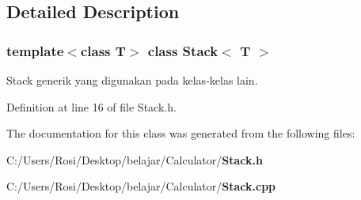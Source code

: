 \subsection{Detailed Description}
\subsubsection*{template$<$class T$>$ class Stack$<$ T $>$}

Stack generik yang digunakan pada kelas-kelas lain. 



Definition at line 16 of file Stack.h.

The documentation for this class was generated from the following files:\begin{CompactItemize}
\item 
C:/Users/Rosi/Desktop/belajar/Calculator/{\bf Stack.h}\item 
C:/Users/Rosi/Desktop/belajar/Calculator/{\bf Stack.cpp}\end{CompactItemize}
